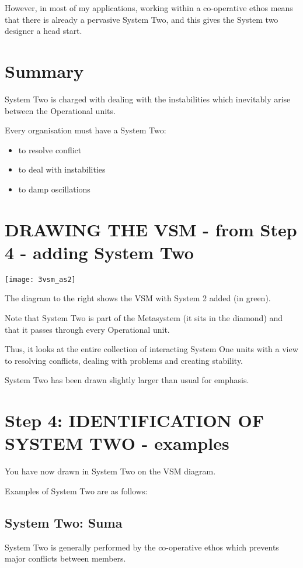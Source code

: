 However, in most of my applications, working within a co-operative ethos means that there is already a pervasive System Two, and this gives the System two designer a head start.

\section*{Summary}
System Two is charged with dealing with the instabilities which inevitably arise between the Operational units.

Every organisation must have a System Two:

\begin{itemize}
  \item to resolve conflict

  \item to deal with instabilities

  \item to damp oscillations

\end{itemize}

\section*{DRAWING THE VSM - from Step 4 - adding System Two}
\begin{center}
\texttt{[image: 3vsm\_as2]}
\end{center}

The diagram to the right shows the VSM with System 2 added (in green).

Note that System Two is part of the Metasystem (it sits in the diamond) and that it passes through every Operational unit.

Thus, it looks at the entire collection of interacting System One units with a view to resolving conflicts, dealing with problems and creating stability.

System Two has been drawn slightly larger than usual for emphasis.


\section*{Step 4: IDENTIFICATION OF SYSTEM TWO - examples}
You have now drawn in System Two on the VSM diagram.

Examples of System Two are as follows:

\subsection*{System Two: Suma}
System Two is generally performed by the co-operative ethos which prevents major conflicts between members.


